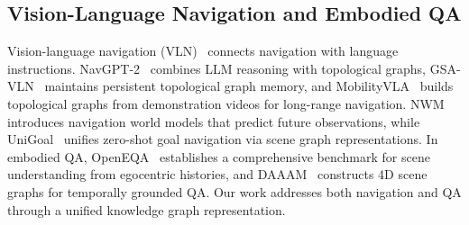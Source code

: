 \subsection{Vision-Language Navigation and Embodied QA}
Vision-language navigation (VLN)~\cite{wu2024vision, anderson2018vision} connects navigation with language instructions.
NavGPT-2~\cite{zhou2024navgpt} combines LLM reasoning with topological graphs, GSA-VLN~\cite{gsavln2025iclr} maintains persistent topological graph memory, and MobilityVLA~\cite{chiang2024mobility} builds topological graphs from demonstration videos for long-range navigation.
NWM~\cite{nwm2025cvpr} introduces navigation world models that predict future observations, while UniGoal~\cite{unigoal2025cvpr} unifies zero-shot goal navigation via scene graph representations.
In embodied QA, OpenEQA~\cite{majumdar2024openeqa} establishes a comprehensive benchmark for scene understanding from egocentric histories, and DAAAM~\cite{daaam2025arxiv} constructs 4D scene graphs for temporally grounded QA.
Our work addresses both navigation and QA through a unified knowledge graph representation.

